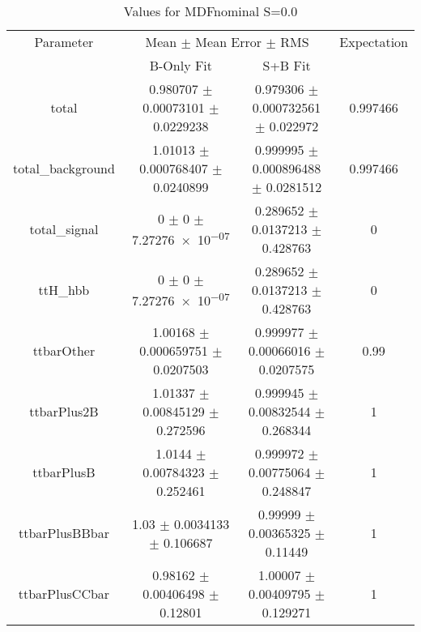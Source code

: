 \begin{table}
\centering
\caption{Values for MDFnominal S=0.0}
\begin{tabular}{cccc}
\toprule
Parameter & \multicolumn{2}{c}{Mean $\pm$ Mean Error $\pm$ RMS} & Expectation\\
 & B-Only Fit & S+B Fit & \\
\midrule
total & \num{0.980707} $\pm$ \num{0.00073101} $\pm$ \num{0.0229238} & \num{0.979306} $\pm$ \num{0.000732561} $\pm$ \num{0.022972} & \num{0.997466}\\
total\_background & \num{1.01013} $\pm$ \num{0.000768407} $\pm$ \num{0.0240899} & \num{0.999995} $\pm$ \num{0.000896488} $\pm$ \num{0.0281512} & \num{0.997466}\\
total\_signal & \num{0} $\pm$ \num{0} $\pm$ \num{7.27276e-07} & \num{0.289652} $\pm$ \num{0.0137213} $\pm$ \num{0.428763} & \num{0}\\
ttH\_hbb & \num{0} $\pm$ \num{0} $\pm$ \num{7.27276e-07} & \num{0.289652} $\pm$ \num{0.0137213} $\pm$ \num{0.428763} & \num{0}\\
ttbarOther & \num{1.00168} $\pm$ \num{0.000659751} $\pm$ \num{0.0207503} & \num{0.999977} $\pm$ \num{0.00066016} $\pm$ \num{0.0207575} & \num{0.99}\\
ttbarPlus2B & \num{1.01337} $\pm$ \num{0.00845129} $\pm$ \num{0.272596} & \num{0.999945} $\pm$ \num{0.00832544} $\pm$ \num{0.268344} & \num{1}\\
ttbarPlusB & \num{1.0144} $\pm$ \num{0.00784323} $\pm$ \num{0.252461} & \num{0.999972} $\pm$ \num{0.00775064} $\pm$ \num{0.248847} & \num{1}\\
ttbarPlusBBbar & \num{1.03} $\pm$ \num{0.0034133} $\pm$ \num{0.106687} & \num{0.99999} $\pm$ \num{0.00365325} $\pm$ \num{0.11449} & \num{1}\\
ttbarPlusCCbar & \num{0.98162} $\pm$ \num{0.00406498} $\pm$ \num{0.12801} & \num{1.00007} $\pm$ \num{0.00409795} $\pm$ \num{0.129271} & \num{1}\\
\bottomrule
\end{tabular}
\end{table}